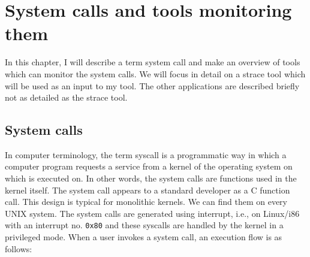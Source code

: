 \chapter{System calls and tools monitoring them}
\label{chap:syscalls}
In this chapter, I will describe a term system call and make an overview of tools which can monitor the system calls.
We will focus in detail on a strace tool which will be used as an input to my tool.
The other applications are described briefly not as detailed as the strace tool.

\section{System calls}

In computer terminology, the term syscall is a programmatic way in which a computer program requests a service from a kernel of the operating system on which is executed on.
In other words, the system calls are functions used in the kernel itself.
The system call appears to a standard developer as a C function call.
This design is typical for monolithic kernels.
We can find them on every UNIX system.
The system calls are generated using interrupt, i.e., on Linux/i86 with an interrupt no. \texttt{0x80} and these syscalls are handled by the kernel in a privileged mode.
When a user invokes a system call, an execution flow is as follows:
